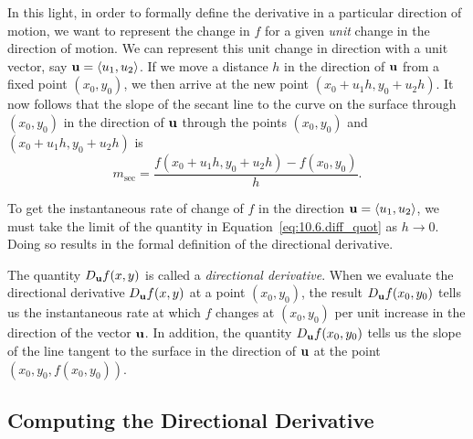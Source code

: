 In this light, in order to formally define the derivative in a particular direction of motion, we want to represent the change in $f$ for a given \emph{unit} change in the direction of motion. We can represent this unit change in direction with a unit vector, say $\mathbf{u} = \langle u_1, u_2 \rangle$.  If we move a distance $h$ in the direction of $\mathbf{u}$ from a fixed point $(x_0,y_0)$, we then arrive at the new point $(x_0+u_1h, y_0+u_2h)$.  It now follows that the slope of the secant line to the curve on the surface through $(x_0,y_0)$ in the direction of $\mathbf{u}$ through the points $(x_0,y_0)$ and $(x_0+u_1h, y_0+u_2h)$ is
\begin{equation}
m_{\mbox{sec}} = \frac{f(x_0+u_1h, y_0+u_2h) - f(x_0,y_0)}{h}. \label{eq:10.6.diff_quot}
\end{equation}

To get the instantaneous rate of change of $f$ in the direction $\mathbf{u} = \langle u_1, u_2 \rangle$, we must take the limit of the quantity in Equation~\eqref{eq:10.6.diff_quot} as $h \to 0$.  Doing so results in the formal definition of the directional derivative.

\vspace*{5pt}
\nin {}
\vspace*{5pt}

The quantity $D_{\mathbf{u}} f(x,y)$ is called a \emph{directional derivative}. When we evaluate the directional derivative $D_{\mathbf{u}} f(x,y)$ at a point $(x_0, y_0)$, the result $D_{\mathbf{u}} f(x_0,y_0)$ tells us the instantaneous rate at which $f$ changes at $(x_0, y_0)$ per unit increase in the direction of the vector $\mathbf{u}$. In addition, the quantity $D_{\mathbf{u}} f(x_0,y_0)$  tells us the slope of the line tangent to the surface in the direction of $\mathbf{u}$ at the point $(x_0,y_0,f(x_0,y_0))$.

\subsection*{Computing the Directional Derivative}

